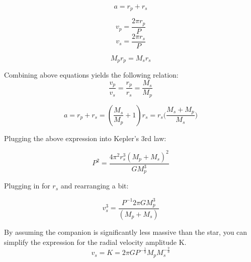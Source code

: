 \begin{equation}
a = r_p + r_s
\end{equation}

\begin{equation}
v_p = \frac{2\pi r_p}{P}
\end{equation}
\begin{equation}
v_s = \frac{2\pi r_s}{P}
\end{equation}

\begin{equation}
M_pr_p = M_sr_s
\end{equation}

Combining above equations yields the following relation:
\begin{equation}
\frac{v_p}{v_s} = \frac{r_p}{r_s} = \frac{M_s}{M_p}
\end{equation} 

\begin{equation}
a = r_p + r_s = (\frac{M_s}{M_p} + 1)r_s = r_s\big(\frac{M_s + M_p}{M_s}\big)
\end{equation}

Plugging the above expression into Kepler's 3rd law:

\begin{equation}
P^2 = \frac{4\pi^2r_s^3(M_p + M_s)^2}{GM_p^3}
\end{equation}

Plugging in for $r_s$ and rearranging a bit:

\begin{equation}
v_s^3 = \frac{P^{-1}2\pi GM_p^3}{(M_p + M_s)}
\end{equation}

By assuming the companion is significantly less massive than the star, you can simplify the expression for the radial velocity amplitude K.  
\begin{equation}
v_s = K = 2\pi G P^{-\frac{1}{3}}M_pM_s^{-\frac{2}{3}}
\end{equation}

